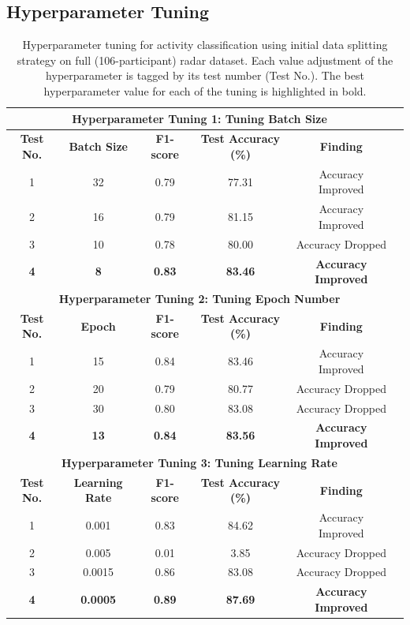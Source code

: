 \documentclass{l4proj}
\begin{document}
\begin{appendices}
\subsection{Hyperparameter Tuning}
\begin{table}[h]
    \centering
    \begin{tabular}{cccccc}
        \multicolumn{5}{c}{\textbf{Hyperparameter Tuning 1: Tuning Batch Size}} \\
        \toprule
        \textbf{Test No.} & \textbf{Batch Size} & \textbf{F1-score} & \textbf{Test Accuracy (\%)} & \textbf{Finding} \\
        1 & 32 & 0.79 & 77.31 & Accuracy Improved \\
        2 & 16 & 0.79 & 81.15 & Accuracy Improved \\
        3 & 10 & 0.78 & 80.00 & Accuracy Dropped \\
        \textbf{4} & \textbf{8} & \textbf{0.83} & \textbf{83.46} & \textbf{Accuracy Improved} \\
        \midrule
        \multicolumn{5}{c}{\textbf{Hyperparameter Tuning 2: Tuning Epoch Number}} \\
        \midrule
        \textbf{Test No.} & \textbf{Epoch} & \textbf{F1-score} & \textbf{Test Accuracy (\%)} & \textbf{Finding} \\
        1 & 15 & 0.84 & 83.46 & Accuracy Improved \\
        2 & 20 & 0.79 & 80.77 & Accuracy Dropped \\
        3 & 30 & 0.80 & 83.08 & Accuracy Dropped \\
        \textbf{4} & \textbf{13} & \textbf{0.84} & \textbf{83.56} & \textbf{Accuracy Improved}\\
        \midrule
        \multicolumn{5}{c}{\textbf{Hyperparameter Tuning 3: Tuning Learning Rate}} \\
        \midrule
        \textbf{Test No.} & \textbf{Learning Rate} & \textbf{F1-score} & \textbf{Test Accuracy (\%)} & \textbf{Finding} \\
        1 & 0.001 & 0.83 & 84.62 & Accuracy Improved \\
        2 & 0.005 & 0.01 & 3.85 & Accuracy Dropped \\
        3 & 0.0015 & 0.86 & 83.08 & Accuracy Dropped \\
        \textbf{4} & \textbf{0.0005} & \textbf{0.89} & \textbf{87.69} & \textbf{Accuracy Improved}\\
        \bottomrule
    \end{tabular}
    \caption{Hyperparameter tuning for activity classification using initial data splitting strategy on full (106-participant) radar dataset. Each value adjustment of the hyperparameter is tagged by its test number (Test No.). The best hyperparameter value for each of the tuning is highlighted in bold.}
    \label{tab:activity-hyperparameter-tuning}
\end{table}


\end{appendices}
\end{document}
